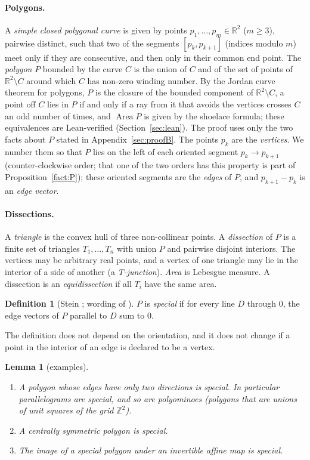 \documentclass[11pt]{article}
\newtheorem{lemma}[theorem]{Lemma}
\theoremstyle{definition}
\newtheorem{definition}[theorem]{Definition}
\newcommand{\Z}{\mathbb{Z}}
\newcommand{\R}{\mathbb{R}}
\newcommand{\Area}{\operatorname{Area}}
\begin{document}
\paragraph{Polygons.} A \emph{simple closed polygonal curve} is given by points
$p_1,\dots,p_m\in\R^2$ ($m\ge3$), pairwise distinct, such that two of the segments
$[p_k,p_{k+1}]$ (indices modulo $m$) meet only if they are consecutive, and then only in their
common end point. The \emph{polygon} $P$ bounded by the curve $C$ is the union of $C$ and of the set
of points of $\R^2\setminus C$ around which $C$ has non-zero winding number. By the Jordan curve
theorem for polygons, $P$ is the closure of the bounded component of $\R^2\setminus C$, a point off
$C$ lies in $P$ if and only if a ray from it that avoids the vertices crosses $C$ an odd number of
times, and $\Area P$ is given by the shoelace formula; these equivalences are Lean-verified
(Section~\ref{sec:lean}). The proof uses only the two facts about $P$ stated in
Appendix~\ref{sec:proofB}. The points $p_k$ are the \emph{vertices}. We number them so that $P$
lies on the left of each oriented segment $p_k\to p_{k+1}$ (counter-clockwise order; that one of
the two orders has this property is part of Proposition~\ref{fact:P}); these oriented segments are the
\emph{edges} of $P$, and $p_{k+1}-p_k$ is an \emph{edge vector}.

\paragraph{Dissections.} A \emph{triangle} is the convex hull of three non-collinear points. A
\emph{dissection} of $P$ is a finite set of triangles $T_1,\dots,T_n$ with union $P$ and pairwise
disjoint interiors. The vertices may be arbitrary real points, and a vertex of one triangle may lie
in the interior of a side of another (a \emph{T-junction}). \emph{Area} is Lebesgue measure. A
dissection is an \emph{equidissection} if all $T_i$ have the same area.

\begin{definition}[{Stein \cite[p.~141]{Ste00}; wording of \cite{Rud}}]\label{def:special}
$P$ is \emph{special} if for every line $D$ through $0$, the edge vectors of $P$ parallel to $D$
sum to $0$.
\end{definition}

The definition does not depend on the orientation, and it does not change if a point in the
interior of an edge is declared to be a vertex.

\begin{lemma}[examples]\label{lem:examples}
\begin{enumerate}[label=(\alph*)]
\item A polygon whose edges have only two directions is special. In particular parallelograms are
special, and so are polyominoes (polygons that are unions of unit squares of the grid $\Z^2$).
\item A centrally symmetric polygon is special.
\item The image of a special polygon under an invertible affine map is special.
\end{enumerate}
\end{lemma}
\end{document}
